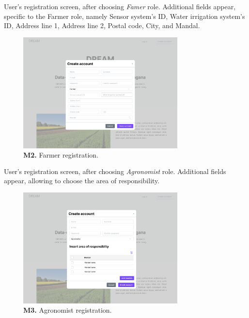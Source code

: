 User's registration screen, after choosing \textit{Famer} role. Additional fields appear, specific to the Farmer role, namely Sensor system's ID, Water irrigation system's ID, Address line 1, Address line 2, Postal code, City, and Mandal.
\begin{figure}[H]
    \centering
    \includegraphics[width=0.75\textwidth]{mockups/Unreg. user_Create account_Farmer.png}
    \caption{\textbf{M2.} Farmer registration.}
\end{figure}

User's registration screen, after choosing \textit{Agronomist} role. Additional fields appear, allowing to choose the area of responsibility.
\begin{figure}[H]
    \centering
    \includegraphics[width=0.75\textwidth]{mockups/Unreg. user_Create account_Agronomist.png}
    \caption{\textbf{M3.} Agronomist registration.}
\end{figure}

